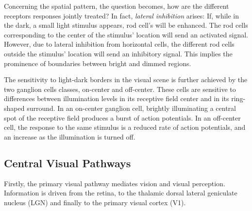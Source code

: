 Concerning the spatial pattern, the question becomes, how are the different receptors responses jointly treated? In fact, \textit{lateral inhibition} arises: If, while in the dark, a small light stimulus appears, rod cell's will be enhanced. The rod cells corresponding to the center of the stimulus' location will send an activated signal. However, due to lateral inhibition from horizontal cells, the different rod cells outside the stimulus' location will send an inhibitory signal. This implies the prominence of boundaries between bright and dimmed regions. 

The sensitivity to light-dark borders in the visual scene is further achieved by the two ganglion cells classes, on-center and off-center. These cells are sensitive to differences between illumination levels in its receptive field center and in its ring-shaped surround. In an on-center ganglion cell, brightly illuminating a central spot of the receptive field produces a burst of action potentials. In an off-center cell, the response to the same stimulus is a reduced rate of action potentials, and an increase as the illumination is turned off. %







\vspace{-0.2cm}

\subsection{Central Visual Pathways}

Firstly, the primary visual pathway mediates vision and visual perception. Information is driven from the retina, to the thalamic dorsal lateral geniculate nucleus (LGN) and finally to the primary visual cortex (V1).%

